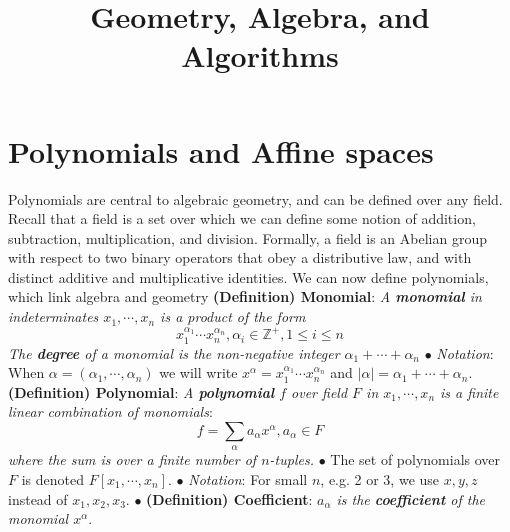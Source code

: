 \documentclass{article}
\begin{document}
\title{Geometry, Algebra, and Algorithms}
\maketitle

\section{Polynomials and Affine spaces}

Polynomials are central to algebraic geometry, and can be defined over any field. Recall that a field is a set over which we can define some notion of addition, subtraction, multiplication, and division.
\newline
Formally, a field is an Abelian group with respect to two binary operators that obey a distributive law, and with distinct additive and multiplicative identities.
\newline
We can now define polynomials, which link algebra and geometry
\newline \newline
\textbf{(Definition) Monomial}: \textit{A \textbf{monomial} in indeterminates $ x_1, \cdots, x_n $ is a product of the form}
$$ x_1^{\alpha_1} \cdots x_n^{\alpha_n}, \alpha_i \in \mathbb{Z}^+, 1 \leq i \leq n $$
\indent \textit{The \textbf{degree} of a monomial is the non-negative integer $ \alpha_1 + \cdots + \alpha_n $}
\newline
\indent $ \bullet $ \textit{Notation}: When $ \alpha = (\alpha_1, \cdots, \alpha_n) $ we will write $ x^{\alpha} = x_1^{\alpha_1} \cdots x_n^{\alpha_n} $ and $ |\alpha| = \alpha_1 + \cdots + \alpha_n $.
\newline \newline
\textbf{(Definition) Polynomial}: \textit{A \textbf{polynomial} $ f $ over field $ F $ in $ x_1, \cdots, x_n $ is a finite linear combination of monomials}:
$$ f = \sum_{\alpha} a_{\alpha} x^{\alpha}, a_{\alpha} \in F $$
\indent \textit{where the sum is over a finite number of $ n $-tuples.}
\newline
\indent $ \bullet $ The set of polynomials over $ F $ is denoted $ F[x_1, \cdots, x_n] $.
\newline
\indent $ \bullet $ \textit{Notation}: For small $ n $, e.g. 2 or 3, we use $ x, y, z $ instead of $ x_1, x_2, x_3 $.
\newline
\indent $ \bullet $ \textbf{(Definition) Coefficient}: \textit{$ a_{\alpha} $ is the \textbf{coefficient} of the monomial $ x^{\alpha} $}.
\newline
\end{document}
